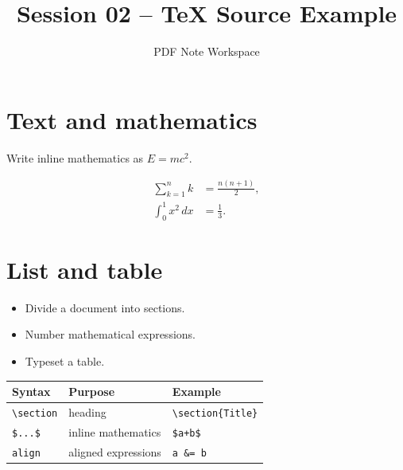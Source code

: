 \documentclass[11pt]{article}
\title{Session 02 -- TeX Source Example}
\author{PDF Note Workspace}
\date{}
\begin{document}
\maketitle

\section{Text and mathematics}
Write inline mathematics as $E = mc^2$.

\begin{align}
  \sum_{k=1}^{n} k &= \frac{n(n+1)}{2}, \\
  \int_0^1 x^2\,dx &= \frac{1}{3}.
\end{align}

\section{List and table}
\begin{itemize}
  \item Divide a document into sections.
  \item Number mathematical expressions.
  \item Typeset a table.
\end{itemize}

\begin{tabular}{lll}
\toprule
Syntax & Purpose & Example \\
\midrule
\verb|\section| & heading & \verb|\section{Title}| \\
\verb|$...$| & inline mathematics & \verb|$a+b$| \\
\verb|align| & aligned expressions & \verb|a &= b| \\
\bottomrule
\end{tabular}
\end{document}
